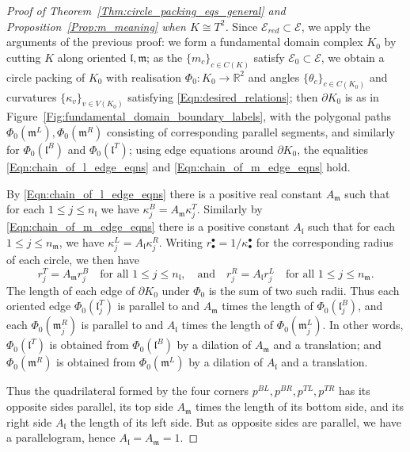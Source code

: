\documentclass[12pt]{amsart}
\numberwithin{equation}{section}
\theoremstyle{named}
\newcommand{\reffig}[1]{Figure~\ref{Fig:#1}}
\newcommand{\refeqn}[1]{\eqref{Eqn:#1}}
\newcommand{\refprop}[1]{Proposition~\ref{Prop:#1}}
\newcommand{\refthm}[1]{Theorem~\ref{Thm:#1}}
\newcommand{\R}{\mathbb{R}}
\newcommand{\To}{\longrightarrow}
\begin{document}
\begin{proof}[ Proof of \refthm{circle_packing_eqs_general} and \refprop{m_meaning} when $K \cong T^2$]
Since $\mathcal{E}_{red} \subset \mathcal{E}$, we apply the arguments of the previous proof: we form a fundamental domain complex $K_0$ by cutting $K$ along oriented $\mathfrak{l}, \mathfrak{m}$; as the $\{m_c\}_{c \in C(K)}$ satisfy $\mathcal{E}_0 \subset \mathcal{E}$, we obtain a circle packing of $K_0$ with realisation $\Phi_0 \colon K_0 \To \R^2$ and angles $\{\theta_c\}_{c \in C(K_0)}$ and curvatures $\{\kappa_v\}_{v \in V(K_0)}$ satisfying \refeqn{desired_relations}; then $\partial K_0$ is as in \reffig{fundamental_domain_boundary_labels}, with the polygonal paths $\Phi_0(\mathfrak{m}^L), \Phi_0(\mathfrak{m}^R)$ consisting of corresponding parallel segments, and similarly for $\Phi_0(\mathfrak{l}^B)$ and $\Phi_0(\mathfrak{l}^T)$; using edge equations around $\partial K_0$, the equalities \refeqn{chain_of_l_edge_eqns} and \refeqn{chain_of_m_edge_eqns} hold.

By \refeqn{chain_of_l_edge_eqns} there is a positive real constant $A_\mathfrak{m}$ such that for each $1 \leq j \leq n_{\mathfrak{l}}$ we have $\kappa_j^B = A_\mathfrak{m} \kappa_j^T$. Similarly by \refeqn{chain_of_m_edge_eqns} there is a positive constant $A_\mathfrak{l}$ such that for each $1 \leq j \leq n_{\mathfrak{m}}$, we have $\kappa_j^L = A_\mathfrak{l} \kappa_j^R$. Writing $r_\bullet^\bullet = 1/\kappa_\bullet^\bullet$ for the corresponding radius of each circle, we then have
\[
r_j^T = A_\mathfrak{m} r_j^B \quad \text{for all $1 \leq j \leq n_\mathfrak{l}$}, \quad \text{and} \quad
r_j^R = A_\mathfrak{l} r_j^L \quad \text{for all $1 \leq j \leq n_\mathfrak{m}$}.
\]
The length of each edge of $\partial K_0$ under $\Phi_0$ is the sum of two such radii. Thus each oriented edge $\Phi_0 (\mathfrak{l}_j^T)$ is parallel to and $A_\mathfrak{m}$ times the length of $\Phi_0 (\mathfrak{l}_j^B)$, and each $\Phi_0 (\mathfrak{m}_j^R)$ is parallel to and $A_\mathfrak{l}$ times the length of $\Phi_0 (\mathfrak{m}_j^L)$. In other words, $\Phi_0 (\mathfrak{l}^T)$ is obtained from $\Phi_0 (\mathfrak{l}^B)$ by a dilation of $A_\mathfrak{m}$ and a translation; and $\Phi_0(\mathfrak{m}^R)$ is obtained from $\Phi_0(\mathfrak{m}^L)$ by a dilation of $A_\mathfrak{l}$ and a translation.

Thus the quadrilateral formed by the four corners $p^{BL}, p^{BR}, p^{TL}, p^{TR}$ has its opposite sides parallel, its top side $A_\mathfrak{m}$ times the length of its bottom side, and its right side $A_\mathfrak{l}$ the length of its left side. But as opposite sides are parallel, we have a parallelogram, hence $A_\mathfrak{l} = A_\mathfrak{m} = 1$. 


\end{proof}
\end{document}
